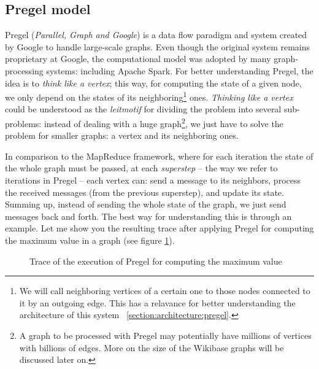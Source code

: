 \subsection{Pregel model}

Pregel (\textit{Parallel, Graph and Google}) is a data flow paradigm and system created by Google to handle large-scale graphs. Even though the original system remains proprietary at Google, the computational model was adopted by many graph-processing systems: including Apache Spark. For better understanding Pregel, the idea is to \textit{think like a vertex}; this way, for computing the state of a given node, we only depend on the states of its neighboring\footnote{We will call neighboring vertices of a certain one to those nodes connected to it by an outgoing edge. This has a relavance for better understanding the architecture of this system ~\ref{section:architecture:pregel}.} ones. \textit{Thinking like a vertex} could be understood as the \textit{leitmotif} for dividing the problem into several sub-problems: instead of dealing with a huge graph\footnote{A graph to be processed with Pregel may potentially have millions of vertices with billions of edges. More on the size of the Wikibase graphs will be discussed later on.}, we just have to solve the problem for smaller graphs: a vertex and its neighboring ones.

In comparison to the MapReduce framework, where for each iteration the state of the whole graph must be passed, at each \textit{superstep} -- the way we refer to iterations in Pregel -- each vertex can: send a message to its neighbors, process the received messages (from the previous superstep), and update its state. Summing up, instead of sending the whole state of the graph, we just send messages back and forth. The best way for understanding this is through an example. Let me show you the resulting trace after applying Pregel for computing the maximum value in a graph (see figure \ref{fig:pregel}).

\begin{figure}[h]
    \centering
    
    \caption[Trace of the execution of Pregel for computing the maximum value]{Trace of the execution of Pregel for computing the maximum value~\cite{10.1145/1807167.1807184}}
    \label{fig:pregel}
\end{figure}

